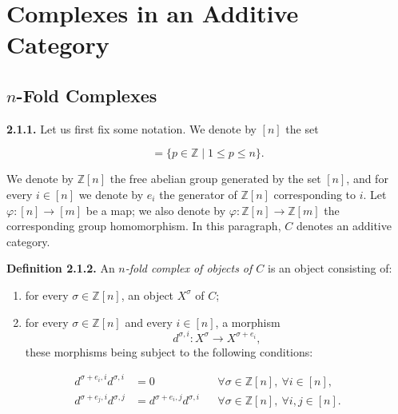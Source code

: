 \clearpage
{}%
\section{Complexes in an Additive Category}

\subsection{\texorpdfstring{$n$}{n}-Fold Complexes}

\noindent\textbf{2.1.1.}\quad
Let us first fix some notation. We denote by $[n]$ the set

\begin{equation*}
  [n]=\{p\in\mathbb Z\mid 1\leq p\leq n\}.
\end{equation*}

We denote by $\mathbb Z[n]$ the free abelian group generated by the set
$[n]$, and for every $i\in[n]$ we denote by $e_i$ the generator of
$\mathbb Z[n]$ corresponding to $i$. Let
$\varphi\colon[n]\longrightarrow[m]$ be a map; we also denote by
$\varphi\colon\mathbb Z[n]\longrightarrow\mathbb Z[m]$ the corresponding
group homomorphism. In this paragraph, $C$ denotes an additive category.

\noindent\textbf{Definition 2.1.2.}\quad
An \emph{$n$-fold complex of objects of $C$} is an object consisting of:

\begin{enumerate}
\renewcommand{\labelenumi}{\arabic{enumi})}
\item {}%
  for every $\sigma\in\mathbb Z[n]$, an object $X^\sigma$ of $C$;
\item {}%
  for every $\sigma\in\mathbb Z[n]$ and every $i\in[n]$, a morphism
  \begin{equation*}
    d^{\sigma,i}\colon X^\sigma\longrightarrow X^{\sigma+e_i},
  \end{equation*}
  these morphisms being subject to the following conditions:
\end{enumerate}

\begin{equation}
  \begin{aligned}
    d^{\sigma+e_i,i}d^{\sigma,i}&=0
      &&\forall\sigma\in\mathbb Z[n],\ \forall i\in[n],\\
    d^{\sigma+e_j,i}d^{\sigma,j}
      &=d^{\sigma+e_i,j}d^{\sigma,i}
      &&\forall\sigma\in\mathbb Z[n],\ \forall i,j\in[n].
  \end{aligned}
  \tag{2.1.2.1}
\end{equation}

